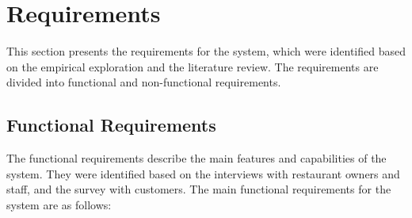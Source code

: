 \section{Requirements}
This section presents the requirements for the system, which were identified based on the empirical exploration and the literature review. The requirements are divided into functional and non-functional requirements.

\subsection*{Functional Requirements}
The functional requirements describe the main features and capabilities of the system. They were identified based on the interviews with restaurant owners and staff, and the survey with customers. The main functional requirements for the system are as follows:

